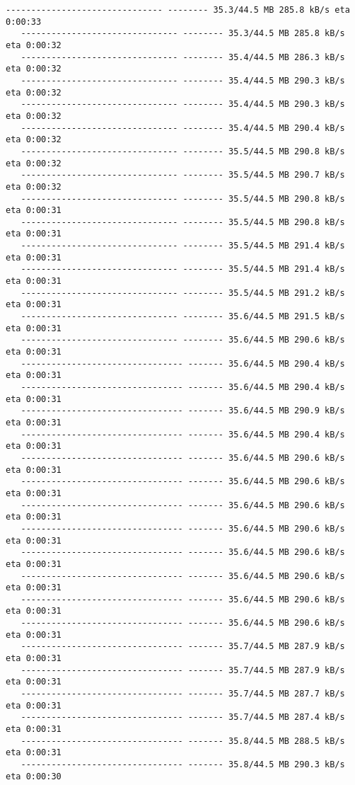 \documentclass[11pt]{article}
\begin{document}
\begin{Verbatim}[commandchars=\\\{\}]
   ------------------------------- -------- 35.3/44.5 MB 285.8 kB/s eta 0:00:33
   ------------------------------- -------- 35.3/44.5 MB 285.8 kB/s eta 0:00:32
   ------------------------------- -------- 35.4/44.5 MB 286.3 kB/s eta 0:00:32
   ------------------------------- -------- 35.4/44.5 MB 290.3 kB/s eta 0:00:32
   ------------------------------- -------- 35.4/44.5 MB 290.3 kB/s eta 0:00:32
   ------------------------------- -------- 35.4/44.5 MB 290.4 kB/s eta 0:00:32
   ------------------------------- -------- 35.5/44.5 MB 290.8 kB/s eta 0:00:32
   ------------------------------- -------- 35.5/44.5 MB 290.7 kB/s eta 0:00:32
   ------------------------------- -------- 35.5/44.5 MB 290.8 kB/s eta 0:00:31
   ------------------------------- -------- 35.5/44.5 MB 290.8 kB/s eta 0:00:31
   ------------------------------- -------- 35.5/44.5 MB 291.4 kB/s eta 0:00:31
   ------------------------------- -------- 35.5/44.5 MB 291.4 kB/s eta 0:00:31
   ------------------------------- -------- 35.5/44.5 MB 291.2 kB/s eta 0:00:31
   ------------------------------- -------- 35.6/44.5 MB 291.5 kB/s eta 0:00:31
   ------------------------------- -------- 35.6/44.5 MB 290.6 kB/s eta 0:00:31
   -------------------------------- ------- 35.6/44.5 MB 290.4 kB/s eta 0:00:31
   -------------------------------- ------- 35.6/44.5 MB 290.4 kB/s eta 0:00:31
   -------------------------------- ------- 35.6/44.5 MB 290.9 kB/s eta 0:00:31
   -------------------------------- ------- 35.6/44.5 MB 290.4 kB/s eta 0:00:31
   -------------------------------- ------- 35.6/44.5 MB 290.6 kB/s eta 0:00:31
   -------------------------------- ------- 35.6/44.5 MB 290.6 kB/s eta 0:00:31
   -------------------------------- ------- 35.6/44.5 MB 290.6 kB/s eta 0:00:31
   -------------------------------- ------- 35.6/44.5 MB 290.6 kB/s eta 0:00:31
   -------------------------------- ------- 35.6/44.5 MB 290.6 kB/s eta 0:00:31
   -------------------------------- ------- 35.6/44.5 MB 290.6 kB/s eta 0:00:31
   -------------------------------- ------- 35.6/44.5 MB 290.6 kB/s eta 0:00:31
   -------------------------------- ------- 35.6/44.5 MB 290.6 kB/s eta 0:00:31
   -------------------------------- ------- 35.7/44.5 MB 287.9 kB/s eta 0:00:31
   -------------------------------- ------- 35.7/44.5 MB 287.9 kB/s eta 0:00:31
   -------------------------------- ------- 35.7/44.5 MB 287.7 kB/s eta 0:00:31
   -------------------------------- ------- 35.7/44.5 MB 287.4 kB/s eta 0:00:31
   -------------------------------- ------- 35.8/44.5 MB 288.5 kB/s eta 0:00:31
   -------------------------------- ------- 35.8/44.5 MB 290.3 kB/s eta 0:00:30

\end{Verbatim}
\end{document}
